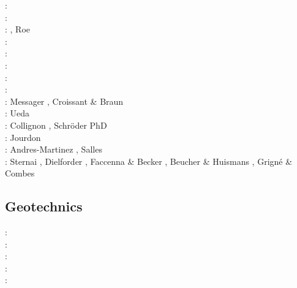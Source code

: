 \begin{scriptsize}
\twothousandsix:      \cite{rosw06}\cite{brau06}\cite{bocr06}\cite{simp06}\cite{stwr06}\cite{golc06}\\
\twothousandseven:    \cite{buto07}\cite{sebp07}\cite{tomk07}\cite{strw07}\\
\twothousandeight:    \cite{alle08}, Roe \etal \cite{rowf08}\\
\twothousandnine:     \cite{whip09}\cite{kuhe09}\cite{makh09}\cite{pina09}\cite{dala09}\cite{bonn09}\\
\twothousandten:      \cite{will10}\cite{tuha10}\cite{brau10}\cite{brau10}\cite{brya10}\cite{crmw10}\\
\twothousandeleven:   \cite{robr11}\cite{grhd11}\\
\twothousandtwelve:   \cite{kiwh12}\cite{brvv12}\\
\twothousandthirteen: \cite{vehc13}\cite{brwi13}\cite{fihv13a}\cite{fihv13b}
                      \cite{brrs13}\cite{chgz13}\cite{tuva13}\cite{caya13} \\
\twothousandfourteen: Messager \etal \cite{mehn14}, Croissant \& Braun \cite{crbr14}
                      \cite{cokm14}\cite{erhv14}\cite{erhv15}\cite{stsc14}\cite{olbm14} \\
\twothousandfifteen:  Ueda \etal \cite{uewg15,fohk15,cofk15}\\
\twothousandsixteen:  Collignon \etal \cite{coyc16}, Schr{\"o}der PhD \cite{schr16}\\
\twothousandeighteen: Jourdon \etal \cite{jolp18}\\
\twothousandnineteen: Andres-Martinez \etal \cite{anpa19}, Salles \cite{sall19}\\
\twothousandtwenty:   Sternai \cite{ster20}, Dielforder \etal \cite{diho20}, Faccenna \& Becker \cite{fabe20},
                      Beucher \& Huismans \cite{behu20}, Grign\'e \& Combes \cite{grco20}
\end{scriptsize}

\subsection{Geotechnics}

\begin{scriptsize}
\nineteenninetynine: \cite{ster99}\\
\twothousandthree: \cite{gora03}\cite{zhll03}\\
\twothousandfour: \cite{gour04}\\
\twothousandsix: \cite{gork06}\\
\twothousandfourteen: \cite{bufy14}
\end{scriptsize}

